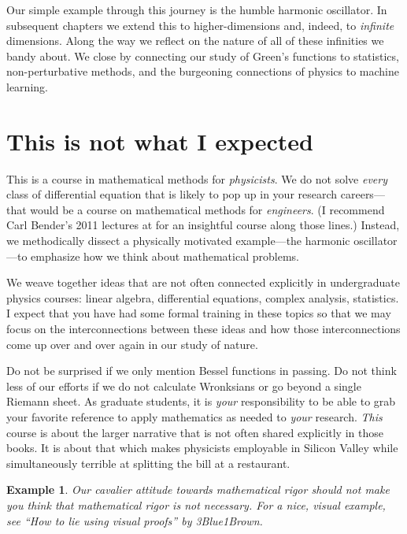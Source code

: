 \documentclass[
  11pt,
	colorful,
	raggedright,
]{tufte-style-thesis-flip}
\newtheorem{example}{Example}[section]
\begin{document}
Our simple example through this journey is the humble harmonic oscillator. In subsequent chapters we extend this to higher-dimensions and, indeed, to \emph{infinite} dimensions. Along the way we reflect on the nature of all of these infinities we bandy about. We close by connecting our study of Green's functions to statistics, non-perturbative methods, and the burgeoning connections of physics to machine learning.

\section{This is not what I expected}


This is a course in mathematical methods for \emph{physicists}.
%
We do not solve \emph{every} class of differential equation that is likely to pop up in your research careers---that would be a course on mathematical methods for \emph{engineers}. (I recommend Carl Bender's 2011 lectures at  for an insightful course along those lines.) Instead, we methodically dissect a physically motivated example---the harmonic oscillator---to emphasize how we think about mathematical problems. 

We weave together ideas that are not often connected explicitly in undergraduate physics courses: linear algebra, differential equations, complex analysis, statistics. I expect that you have had some formal training in these topics so that we may focus on the interconnections between these ideas and how those interconnections come up over and over again in our study of nature.

Do not be surprised if we only mention Bessel functions in passing. Do not think less of our efforts if we do not calculate Wronksians or go beyond a single Riemann sheet. As graduate students, it is \emph{your} responsibility to be able to grab your favorite reference to apply mathematics as needed to \emph{your} research. \emph{This} course is about the larger narrative that is not often shared explicitly in those books. It is about that which makes physicists employable in Silicon Valley while simultaneously terrible at splitting the bill at a restaurant. 

\begin{example}
Our cavalier attitude towards mathematical rigor should not make you think that mathematical rigor is not necessary. For a nice, visual example, see ``How to lie using visual proofs'' by 3Blue1Brown.
\end{example}
 
\end{document}
